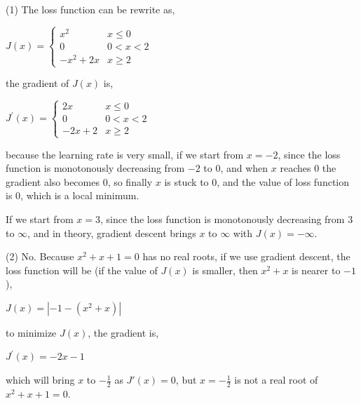\documentclass[11pt]{article}
\begin{document}
\setcounter{page}{3}
\begin{solution}
\item (1) The loss function can be rewrite as,
\begin{center}
$J(x)=
\begin{cases}
x^2& \text{$x \leq 0$}\\
0 & \text{$0 < x < 2$}\\
-x^2 + 2x & \text{$x \geq 2$}
\end{cases}$
\end{center}
the gradient of $J(x)$ is,
\begin{center}
$J^{'}(x)=
\begin{cases}
2x& \text{$x \leq 0$}\\
0 & \text{$0 < x < 2$}\\
-2x + 2 & \text{$x \geq 2$}
\end{cases}$ 
\end{center}
because the learning rate is very small, if we start from $x = -2$, since the loss function is monotonously decreasing from $-2$ to $0$, and when $x$ reaches $0$ the gradient also becomes $0$, so finally $x$ is stuck to $0$, and the value of loss function is $0$, which is a local minimum.
\item If we start from $x = 3$, since the loss function is monotonously decreasing from $3$ to $\infty$, and in theory, gradient descent brings $x$ to $\infty$ with $J(x) = -\infty$. 
\item (2) No. Because $x^2 + x + 1 = 0$ has no real roots, if we use gradient descent, the loss function will be (if the value of $J(x)$ is smaller, then $x^2 + x$ is nearer to $-1$),
\begin{center}
$J(x)= |-1 - (x^2 + x)|$
\end{center}
to minimize $J(x)$, the gradient is,
\begin{center}
$J^{'}(x)= -2x - 1$
\end{center}
which will bring $x$ to $-\frac{1}{2}$ as $J'(x) = 0$, but $x = -\frac{1}{2}$ is not a real root of $x^2 + x + 1 = 0$.
\end{solution}

\end{document}
